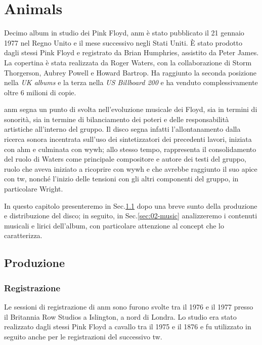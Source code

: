 \documentclass[class=book, crop=false, oneside, 12pt]{standalone}
\begin{document}
    \chapter{Animals}
    \label{ch:02-animals}
    Decimo album in studio dei Pink Floyd, \acrlong{anm} è stato pubblicato il 21 gennaio 1977 nel Regno Unito e il mese successivo negli Stati Uniti. È stato prodotto dagli stessi Pink Floyd e registrato da Brian Humphries, assistito da Peter James. La copertina è stata realizzata da Roger Waters, con la collaborazione di Storm Thorgerson, Aubrey Powell e Howard Bartrop. Ha raggiunto la seconda posizione nella \emph{UK albums} e la terza nella \emph{US Billboard 200} e ha venduto complessivamente oltre 6 milioni di copie.

    \acrshort{anm} segna un punto di svolta nell'evoluzione musicale dei Floyd, sia in termini di sonorità, sia in termine di bilanciamento dei poteri e delle responsabilità artistiche all'interno del gruppo. Il disco segna infatti l'allontanamento dalla ricerca sonora incentrata sull'uso dei sintetizzatori dei precedenti lavori, iniziata con \acrlong{ahm} e culminata con \acrlong {wywh}; allo stesso tempo, rappresenta il consolidamento del ruolo di Waters come principale compositore e autore dei testi del gruppo, ruolo che aveva iniziato a ricoprire con \acrshort{wywh} e che avrebbe raggiunto il suo apice con \acrlong{tw}, nonché l'inizio delle tensioni con gli altri componenti del gruppo, in particolare Wright.

    In questo capitolo presenteremo in Sec.\ref{sec:02-production} dopo una breve sunto della produzione e distribuzione del disco; in seguito, in Sec.\ref{sec:02-music} analizzeremo i contenuti musicali e lirici dell'album, con particolare attenzione al concept che lo caratterizza.

    \section{Produzione}\label{sec:02-production}
    \subsection{Registrazione}
    Le sessioni di registrazione di \acrshort{anm} sono furono svolte tra il 1976 e il 1977 presso il Britannia Row Studios a Islington, a nord di Londra. Lo studio era stato realizzato dagli stessi Pink Floyd a cavallo tra il 1975 e il 1876 e fu utilizzato in seguito anche per le registrazioni del successivo \acrlong{tw}. 
\end{document}
